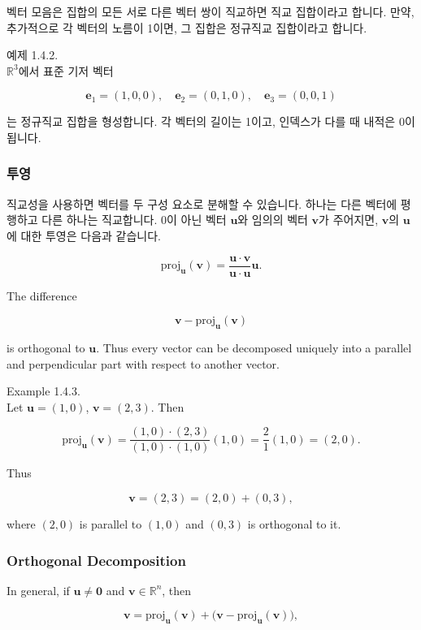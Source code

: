 \documentclass[
  12pt,
  a4paper,
]{article}
\begin{document}
벡터 모음은 집합의 모든 서로 다른 벡터 쌍이
직교하면 직교 집합이라고 합니다. 만약,
추가적으로 각 벡터의 노름이 1이면, 그 집합은 정규직교 집합이라고 합니다.

예제 1.4.2.\\
\(\mathbb{R}^3\)에서 표준 기저 벡터

\[\mathbf{e}_1 = (1,0,0), \quad \mathbf{e}_2 = (0,1,0), \quad \mathbf{e}_3 = (0,0,1)\]

는 정규직교 집합을 형성합니다. 각 벡터의 길이는 1이고, 인덱스가 다를 때 내적은 0이 됩니다.

\subsubsection{투영}\label{projections}

직교성을 사용하면 벡터를 두 구성 요소로 분해할 수 있습니다. 하나는 다른 벡터에 평행하고 다른 하나는 직교합니다.
0이 아닌 벡터 \(\mathbf{u}\)와 임의의 벡터 \(\mathbf{v}\)가 주어지면, \(\mathbf{v}\)의 \(\mathbf{u}\)에 대한 투영은 다음과 같습니다.

\[\text{proj}_{\mathbf{u}}(\mathbf{v}) = \frac{\mathbf{u} \cdot \mathbf{v}}{\mathbf{u} \cdot \mathbf{u}} \mathbf{u}.\]

The difference

\[\mathbf{v} - \text{proj}_{\mathbf{u}}(\mathbf{v})\]

is orthogonal to \(\mathbf{u}\). Thus every vector can be decomposed
uniquely into a parallel and perpendicular part with respect to another
vector.

Example 1.4.3.\\
Let \(\mathbf{u} = (1,0)\), \(\mathbf{v} = (2,3)\). Then

\[\text{proj}_{\mathbf{u}}(\mathbf{v}) = \frac{(1,0)\cdot(2,3)}{(1,0)\cdot(1,0)} (1,0) 
= \frac{2}{1}(1,0) = (2,0).\]

Thus

\[\mathbf{v} = (2,3) = (2,0) + (0,3),\]

where \((2,0)\) is parallel to \((1,0)\) and \((0,3)\) is orthogonal to
it.

\subsubsection{Orthogonal Decomposition}\label{orthogonal-decomposition}

In general, if \(\mathbf{u} \neq \mathbf{0}\) and
\(\mathbf{v} \in \mathbb{R}^n\), then

\[\mathbf{v} = \text{proj}_{\mathbf{u}}(\mathbf{v}) + \big(\mathbf{v} - \text{proj}_{\mathbf{u}}(\mathbf{v})\big),\]
\end{document}
